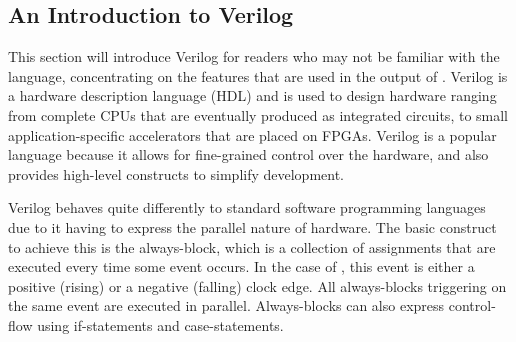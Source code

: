 \subsection{An Introduction to Verilog}

This section will introduce Verilog for readers who may not be familiar with the language, concentrating on the features that are used in the output of \vericert{}.  Verilog is a hardware description language (HDL) and is used to design hardware ranging from complete CPUs that are eventually produced as integrated circuits, to small application-specific accelerators that are placed on FPGAs.  Verilog is a popular language because it allows for fine-grained control over the hardware, and also provides high-level constructs to simplify development.

Verilog behaves quite differently to standard software programming languages due to it having to express the parallel nature of hardware.  The basic construct to achieve this is the always-block, which is a collection of assignments that are executed every time some event occurs.  In the case of \vericert{}, this event is either a positive (rising) or a negative (falling) clock edge.  All always-blocks triggering on the same event are executed in parallel. Always-blocks can also express control-flow using if-statements and case-statements.

